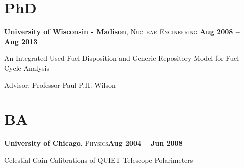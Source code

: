 \documentclass[margin,line]{resume}
\begin{document}
\begin{resume}
    \section{\mysidestyle PhD}
    \textbf{University of Wisconsin - Madison}, \textsc{Nuclear Engineering}\hfill \textbf{ Aug 2008 -- Aug 2013}\vspace{-3mm}\\\vspace{-1mm}%
    \begin{list2}
        \item An Integrated Used Fuel Disposition and Generic Repository Model for Fuel Cycle Analysis
        \item Advisor:  Professor Paul P.H. Wilson
    \end{list2}\vspace{-1.5mm}
    \section{\mysidestyle BA}
    \textbf{University of Chicago}, \textsc{Physics}\hfill\textbf{Aug 2004 -- Jun 2008}\vspace{-3mm}\\\vspace{-1mm}%
    \begin{list2}
	\item Celestial Gain Calibrations of QUIET Telescope Polarimeters
    \end{list2}\vspace{-1.5mm}


\end{resume}
\end{document}
